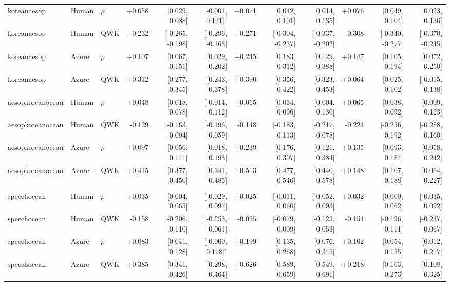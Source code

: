 \begin{landscape}
\begin{longtable}{@{}lllrrrrrrrrr@{}}
\addlinespace[2pt]
koreanaesop & Human & $\rho$ & +0.058 & [0.029, 0.088] & [-0.001, 0.121]$^{\dagger}$ & +0.071 & [0.042, 0.101] & [0.014, 0.135] & +0.076 & [0.049, 0.104] & [0.023, 0.136]\\
koreanaesop & Human & QWK & -0.232 & [-0.265, -0.198] & [-0.296, -0.163] & -0.271 & [-0.304, -0.237] & [-0.337, -0.202] & -0.308 & [-0.340, -0.277] & [-0.370, -0.245]\\
koreanaesop & Azure & $\rho$ & +0.107 & [0.067, 0.151] & [0.029, 0.202] & +0.245 & [0.183, 0.312] & [0.129, 0.388] & +0.147 & [0.105, 0.194] & [0.072, 0.250]\\
koreanaesop & Azure & QWK & +0.312 & [0.277, 0.345] & [0.243, 0.378] & +0.390 & [0.356, 0.422] & [0.323, 0.453] & +0.064 & [0.025, 0.102] & [-0.015, 0.138]\\
\addlinespace[2pt]
aesopkoreanocean & Human & $\rho$ & +0.048 & [0.018, 0.078] & [-0.014, 0.112] & +0.065 & [0.034, 0.096] & [0.004, 0.130] & +0.065 & [0.038, 0.092] & [0.009, 0.123]\\
aesopkoreanocean & Human & QWK & -0.129 & [-0.163, -0.094] & [-0.196, -0.059] & -0.148 & [-0.183, -0.113] & [-0.217, -0.078] & -0.224 & [-0.256, -0.192] & [-0.288, -0.160]\\
aesopkoreanocean & Azure & $\rho$ & +0.097 & [0.056, 0.141] & [0.018, 0.193] & +0.239 & [0.176, 0.307] & [0.121, 0.384] & +0.135 & [0.093, 0.184] & [0.058, 0.242]\\
aesopkoreanocean & Azure & QWK & +0.415 & [0.377, 0.450] & [0.341, 0.485] & +0.513 & [0.477, 0.546] & [0.440, 0.578] & +0.148 & [0.107, 0.188] & [0.064, 0.227]\\
\addlinespace[2pt]
\midrule\multicolumn{12}{l}{\textbf{B-S: three-ratio banded, Spearman}}\\*
speechocean & Human & $\rho$ & +0.035 & [0.004, 0.065] & [-0.029, 0.097] & +0.025 & [-0.011, 0.060] & [-0.052, 0.093] & +0.032 & [0.000, 0.062] & [-0.035, 0.092]\\
speechocean & Human & QWK & -0.158 & [-0.206, -0.110] & [-0.253, -0.061] & -0.035 & [-0.079, 0.009] & [-0.123, 0.053] & -0.154 & [-0.196, -0.111] & [-0.237, -0.067]\\
speechocean & Azure & $\rho$ & +0.083 & [0.041, 0.128] & [-0.000, 0.178]$^{\dagger}$ & +0.199 & [0.135, 0.268] & [0.076, 0.345] & +0.102 & [0.054, 0.155] & [0.012, 0.217]\\
speechocean & Azure & QWK & +0.385 & [0.341, 0.426] & [0.298, 0.464] & +0.626 & [0.589, 0.659] & [0.549, 0.691] & +0.218 & [0.163, 0.273] & [0.108, 0.325]\\

\end{longtable}
\end{landscape}
